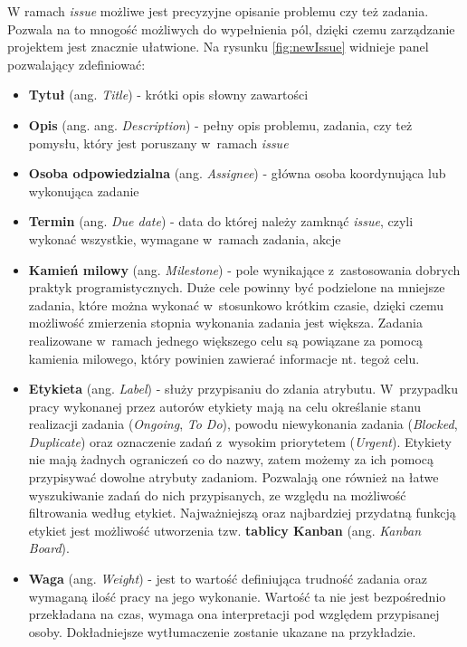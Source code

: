 W ramach \textit{issue} możliwe jest precyzyjne opisanie problemu czy też zadania. Pozwala na to mnogość możliwych do wypełnienia pól, dzięki czemu zarządzanie projektem jest znacznie ułatwione. Na rysunku \ref{fig:newIssue} widnieje panel pozwalający zdefiniować:
\begin{itemize}
\item \textbf{Tytuł} (ang. \textit{Title}) - krótki opis słowny zawartości
\item \textbf{Opis} (ang. ang. \textit{Description}) - pełny opis problemu, zadania, czy też pomysłu, który jest poruszany w~ramach \textit{issue}
\item \textbf{Osoba odpowiedzialna} (ang. \textit{Assignee}) - główna osoba koordynująca lub wykonująca zadanie
\item \textbf{Termin} (ang. \textit{Due date}) - data do której należy zamknąć \textit{issue}, czyli wykonać wszystkie, wymagane w~ramach zadania, akcje
\item \textbf{Kamień milowy} (ang. \textit{Milestone}) - pole wynikające z~zastosowania dobrych praktyk programistycznych. Duże cele powinny być podzielone na mniejsze zadania, które można wykonać w~stosunkowo krótkim czasie, dzięki czemu możliwość zmierzenia stopnia wykonania zadania jest większa. Zadania realizowane w~ramach jednego większego celu są powiązane za pomocą kamienia milowego, który powinien zawierać informacje nt. tegoż celu.
\item \textbf{Etykieta} (ang. \textit{Label}) - służy przypisaniu do zdania atrybutu. W~przypadku pracy wykonanej przez autorów etykiety mają na celu określanie stanu realizacji zadania (\textit{Ongoing}, \textit{To Do}), powodu niewykonania zadania (\textit{Blocked}, \textit{Duplicate}) oraz oznaczenie zadań z~wysokim priorytetem (\textit{Urgent}). Etykiety nie mają żadnych ograniczeń co do nazwy, zatem możemy za ich pomocą przypisywać dowolne atrybuty zadaniom. Pozwalają one również na łatwe wyszukiwanie zadań do nich przypisanych, ze względu na możliwość filtrowania według etykiet. Najważniejszą oraz najbardziej przydatną funkcją etykiet jest możliwość utworzenia tzw. \textbf{tablicy Kanban} (ang. \textit{Kanban Board}).
\item \textbf{Waga} (ang. \textit{Weight}) - jest to wartość definiująca trudność zadania oraz wymaganą ilość pracy na jego wykonanie. Wartość ta nie jest bezpośrednio przekładana na czas, wymaga ona interpretacji pod względem przypisanej osoby. Dokładniejsze wytłumaczenie zostanie ukazane na przykładzie.
\end{itemize}

